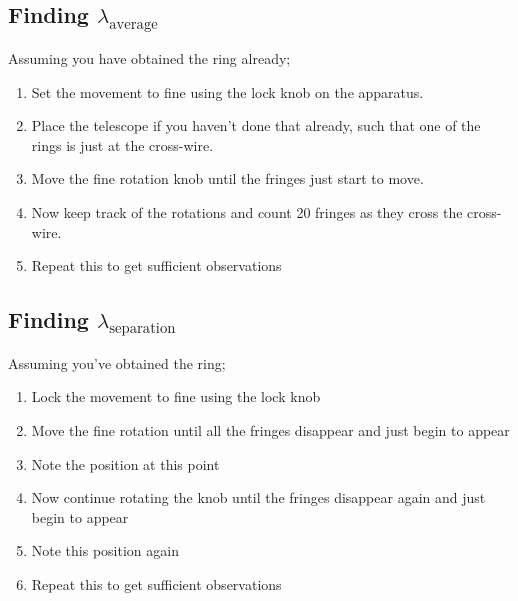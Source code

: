 	\subsection{Finding $\lambda_\text{average}$}
		Assuming you have obtained the ring already;
		\begin{enumerate}
			\item Set the movement to fine using the lock knob on the apparatus.
			\item Place the telescope if you haven't done that already, such that one of the rings is just at the cross-wire.
			\item Move the fine rotation knob until the fringes just start to move.
			\item Now keep track of the rotations and count 20 fringes as they cross the cross-wire.
			\item Repeat this to get sufficient observations			
		\end{enumerate}
	\subsection{Finding $\lambda_\text{separation}$}
		Assuming you've obtained the ring;
		\begin{enumerate}
			\item Lock the movement to fine using the lock knob
			\item Move the fine rotation until all the fringes disappear and just begin to appear
			\item Note the position at this point
			\item Now continue rotating the knob until the fringes disappear again and just begin to appear
			\item Note this position again
			\item Repeat this to get sufficient observations
		\end{enumerate}

